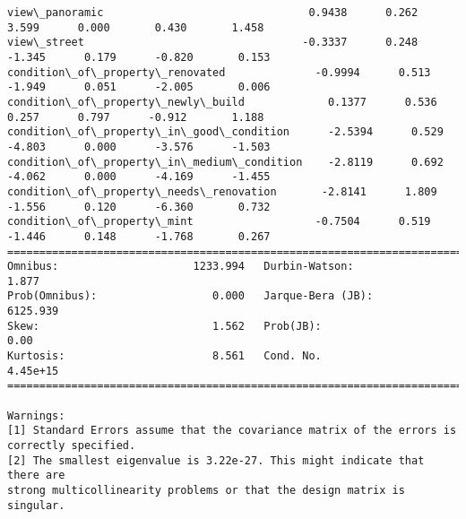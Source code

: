 \documentclass[11pt]{article}
\begin{document}
\begin{Verbatim}[commandchars=\\\{\}]
view\_panoramic                                0.9438      0.262      3.599      0.000       0.430       1.458
view\_street                                  -0.3337      0.248     -1.345      0.179      -0.820       0.153
condition\_of\_property\_renovated              -0.9994      0.513     -1.949      0.051      -2.005       0.006
condition\_of\_property\_newly\_build             0.1377      0.536      0.257      0.797      -0.912       1.188
condition\_of\_property\_in\_good\_condition      -2.5394      0.529     -4.803      0.000      -3.576      -1.503
condition\_of\_property\_in\_medium\_condition    -2.8119      0.692     -4.062      0.000      -4.169      -1.455
condition\_of\_property\_needs\_renovation       -2.8141      1.809     -1.556      0.120      -6.360       0.732
condition\_of\_property\_mint                   -0.7504      0.519     -1.446      0.148      -1.768       0.267
==============================================================================
Omnibus:                     1233.994   Durbin-Watson:                   1.877
Prob(Omnibus):                  0.000   Jarque-Bera (JB):             6125.939
Skew:                           1.562   Prob(JB):                         0.00
Kurtosis:                       8.561   Cond. No.                     4.45e+15
==============================================================================

Warnings:
[1] Standard Errors assume that the covariance matrix of the errors is correctly specified.
[2] The smallest eigenvalue is 3.22e-27. This might indicate that there are
strong multicollinearity problems or that the design matrix is singular.

    \end{Verbatim}
\end{document}
